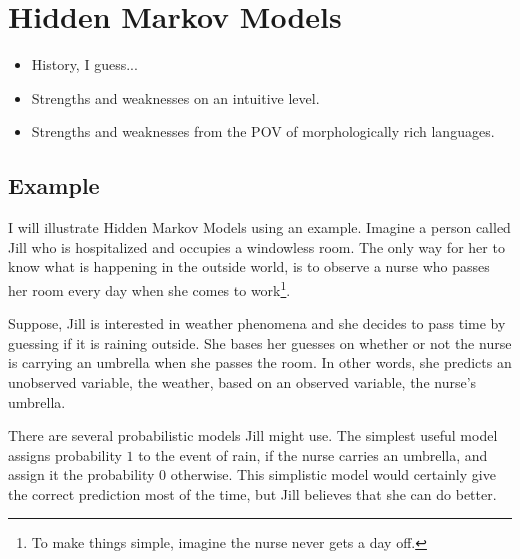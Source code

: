 \chapter{Hidden Markov Models}

\begin{itemize}
\item History, I guess...
\item Strengths and weaknesses on an intuitive level.
\item Strengths and weaknesses from the POV of morphologically rich
  languages.
\end{itemize}

\section{Example}

I will illustrate Hidden Markov Models using an example. Imagine a
person called Jill who is hospitalized and occupies a windowless
room. The only way for her to know what is happening in the outside
world, is to observe a nurse who passes her room every day when she
comes to work\footnote{To make things simple, imagine the nurse never
  gets a day off.}.

Suppose, Jill is interested in weather phenomena and she decides to
pass time by guessing if it is raining outside. She bases her guesses
on whether or not the nurse is carrying an umbrella when she passes
the room. In other words, she predicts an unobserved variable, the
weather, based on an observed variable, the nurse's umbrella.

There are several probabilistic models Jill might use. The simplest
useful model assigns probability $1$ to the event of rain, if the
nurse carries an umbrella, and assign it the probability $0$
otherwise. This simplistic model would certainly give the correct
prediction most of the time, but Jill believes that she can do better.

